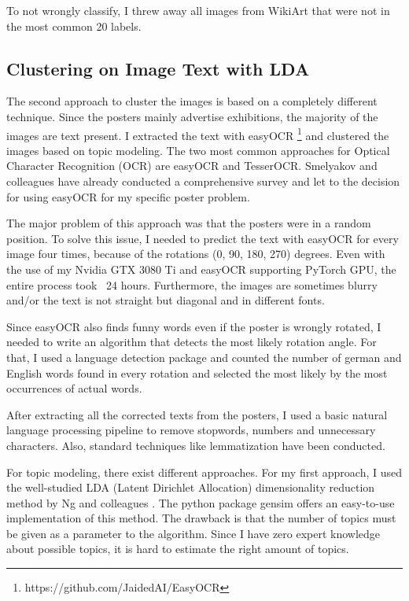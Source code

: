 \documentclass[conference]{IEEEtran}
\begin{document}
To not wrongly classify, I threw away all images from WikiArt that were not in the most common 20 labels. 

\subsection{Clustering on Image Text with LDA}

The second approach to cluster the images is based on a completely different technique. Since the posters mainly advertise exhibitions, the majority of the images are text present. I extracted the text with easyOCR \footnote{https://github.com/JaidedAI/EasyOCR} and clustered the images based on topic modeling. The two most common approaches for Optical Character Recognition (OCR) are easyOCR and TesserOCR. Smelyakov and colleagues have already conducted a comprehensive survey \cite{K.Smelyakov.2021} and let to the decision for using easyOCR for my specific poster problem. 

The major problem of this approach was that the posters were in a random position. To solve this issue, I needed to predict the text with easyOCR for every image four times, because of the rotations (0, 90, 180, 270) degrees. Even with the use of my Nvidia GTX 3080 Ti and easyOCR supporting PyTorch GPU, the entire process took ~24 hours. Furthermore, the images are sometimes blurry and/or the text is not straight but diagonal and in different fonts.

Since easyOCR also finds funny words even if the poster is wrongly rotated, I needed to write an algorithm that detects the most likely rotation angle. For that, I used a language detection package and counted the number of german and English words found in every rotation and selected the most likely by the most occurrences of actual words.

After extracting all the corrected texts from the posters, I used a basic natural language processing pipeline to remove stopwords, numbers and unnecessary characters. Also, standard techniques like lemmatization have been conducted. 

For topic modeling, there exist different approaches. For my first approach, I used the well-studied LDA (Latent Dirichlet Allocation) dimensionality reduction method by Ng and colleagues \cite{Blei.2001}. The python package gensim offers an easy-to-use implementation of this method. The drawback is that the number of topics must be given as a parameter to the algorithm. Since I have zero expert knowledge about possible topics, it is hard to estimate the right amount of topics.
\end{document}
